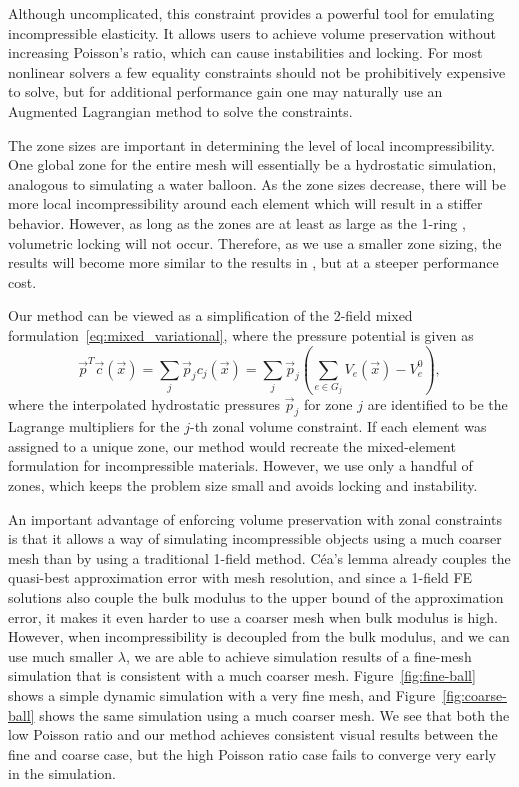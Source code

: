 Although uncomplicated, this constraint provides a powerful tool for emulating incompressible
elasticity. It allows users to achieve volume preservation without increasing Poisson's ratio,
which can cause instabilities and locking. For most nonlinear solvers a few equality constraints should not be prohibitively expensive to solve, but for additional performance gain one may naturally use an Augmented Lagrangian method to solve the constraints. 

The zone sizes are important in determining the level of local incompressibility. One global zone
for the entire mesh will essentially be a hydrostatic simulation, analogous to simulating a water
balloon. As the zone sizes decrease, there will be more local incompressibility around each element
which will result in a stiffer behavior. However, as long as the zones are at least as large as the
1-ring \cite{Irving:2007}, volumetric locking will not occur. Therefore, as we use a smaller zone
sizing, the results will become more similar to the results in \cite{Irving:2007}, but at a steeper performance cost. 

Our method can be viewed as a simplification of the 2-field mixed
formulation~\eqref{eq:mixed_variational}, where the pressure potential is given as
\begin{equation}
\vec{p}^{T}\vec{c}(\vec{x}) = \sum_j \vec{p}_j c_j(\vec{x}) = \sum_j \vec{p}_j \left( \sum_{e \in G_j}
V_e(\vec{x}) - V_e^0 \right),
\label{eq:variational_lagrange}
\end{equation}
where the interpolated hydrostatic pressures $\vec{p}_j$ for zone $j$ are identified to be the
Lagrange multipliers for the $j$-th zonal volume constraint. If each element was assigned to a unique
zone, our method would recreate the mixed-element formulation for incompressible materials. However,
we use only a handful of zones, which keeps the problem size small and avoids locking and instability.

An important advantage of enforcing volume preservation with zonal constraints is that it allows a way of simulating incompressible
objects using a much coarser mesh than by using a traditional 1-field method. C\'ea's lemma already couples the quasi-best approximation error 
with mesh resolution, and since a 1-field FE solutions also couple the bulk modulus to the upper bound of the approximation error, it makes it 
even harder to use a coarser mesh when bulk modulus is high. However, when incompressibility is decoupled from the bulk modulus, and we can 
use much smaller $\lambda$, we are able to achieve simulation results of a fine-mesh simulation that is consistent with a much coarser mesh. 
Figure~\ref{fig:fine-ball} shows a simple dynamic simulation with a very fine mesh, and Figure~\ref{fig:coarse-ball} shows the same simulation
using a much coarser mesh. We see that both the low Poisson ratio and our method achieves consistent visual results between the fine and coarse
case, but the high Poisson ratio case fails to converge very early in the simulation.



